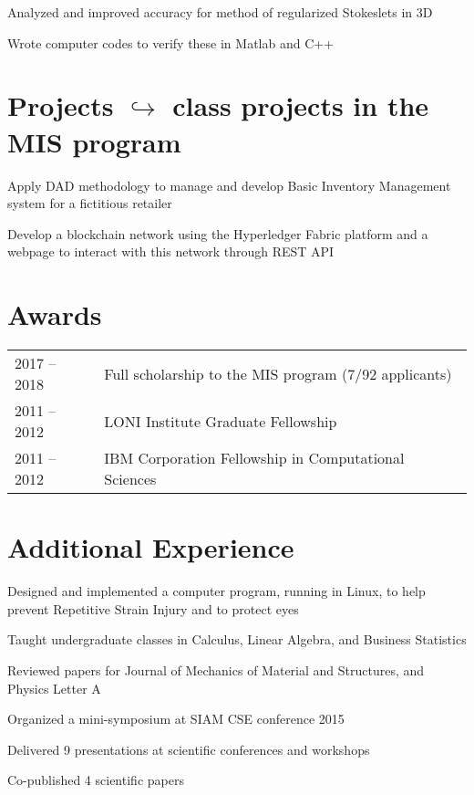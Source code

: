 \documentclass[]{deedy-resume-openfont}
\def\mysep{$\hookrightarrow$ }
\begin{document}
\begin{minipage}[t]{0.63\textwidth}
\descript{\mysep Postdoc}
\begin{tightemize}
  \item Analyzed and improved accuracy for method of regularized
    Stokeslets in 3D
  \item Wrote computer codes to verify these in Matlab and C++
\end{tightemize}

\section{Projects \small \mysep class projects in the MIS program}
\vspace{\topsep}
\begin{tightemize}
\item Apply DAD methodology to manage and develop Basic Inventory Management
  system for a fictitious retailer
\item Develop a blockchain network using the Hyperledger Fabric
  platform and a webpage to interact with this network through REST API
\end{tightemize}

\section{Awards}
\begin{tabular}[h]{ll}
  2017 -- 2018 & Full scholarship to the MIS program (7/92 applicants)\\
  2011 -- 2012 & LONI Institute Graduate Fellowship\\
  2011 -- 2012 & IBM Corporation Fellowship in Computational Sciences
\end{tabular}
\sectionsep

\section{Additional Experience}
\vspace{\topsep}
\begin{tightemize}
\item Designed and implemented a computer program, running in Linux, to
  help prevent Repetitive Strain Injury and to protect eyes
\item Taught undergraduate classes in Calculus, Linear Algebra, and Business Statistics
\item Reviewed papers for Journal of Mechanics of Material and Structures, and Physics Letter A
\item Organized a mini-symposium at SIAM CSE 
  conference 2015
\item Delivered 9 presentations at scientific conferences and workshops
\item Co-published 4 scientific papers
\end{tightemize}

\end{minipage}
\end{document}
